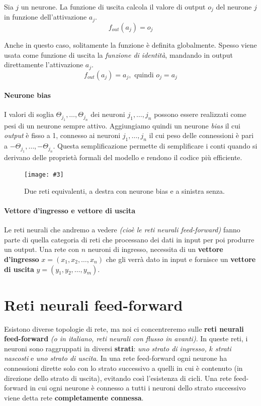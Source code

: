 \documentclass[12pt, twoside, letterpaper]{report}
\newcommand{\img}[4] {
	\begin{figure}
		\centering
		\texttt{[image: \#3]}\\
		\caption{#1}
		\label{#4}
	\end{figure}
}
\begin{document}
			 	Sia $j$ un neurone. La funzione di uscita calcola il valore di output $o_j$ del neurone $j$ in funzione dell'attivazione $a_j$. $$f_{out}(a_j) = o_j$$  
			 	
			 	Anche in questo caso, solitamente la funzione è definita globalmente. Spesso viene usata come funzione di uscita la \textit{funzione di identità}, mandando in output direttamente l'attivazione $a_j$. $$f_{out}(a_j) = a_j, \text{ quindi } o_j = a_j$$
			 	
			 \paragraph{Neurone bias} I valori di soglia $\Theta_{j_1}, \dots, \Theta_{j_n}$ dei neuroni $j_1, \dots, j_n$ possono essere realizzati come pesi di un neurone sempre attivo. Aggiungiamo quindi un neurone \textit{bias} il cui \textit{output} è fisso a 1, connesso ai neuroni $j_1, \dots, j_n$ il cui peso delle connessioni è pari a $-\Theta_{j_1}, \dots, -\Theta_{j_n}$. Questa semplificazione permette di semplificare i conti quando si derivano delle proprietà formali del modello e rendono il codice più efficiente.
			 
			 	\img{Due reti equivalenti, a destra con neurone bias e a sinistra senza.}{0.5}{bias-neuron.png}{bias}
			 	
			 \paragraph{Vettore d'ingresso e vettore di uscita} Le reti neurali che andremo a vedere \textit{(cioè le reti neurali feed-forward)} fanno parte di quella categoria di reti che processano dei dati in input per poi produrre un output. Una rete con $n$ neuroni di ingresso, necessita di un \textbf{vettore d'ingresso} $x = (x_1, x_2, \dots, x_n)$ che gli verrà dato in input e fornisce un \textbf{vettore di uscita} $y = (y_1, y_2, \dots, y_m)$.  
			 	 			 
		\section{Reti neurali feed-forward}
			Esistono diverse topologie di rete, ma noi ci concentreremo sulle \textbf{reti neurali feed-forward} \textit{(o in italiano, reti neurali con flusso in avanti)}. In queste reti, i neuroni sono raggruppati in diversi \textbf{strati}: \textit{uno strato di ingresso, $k$ strati nascosti} e \textit{uno strato di uscita}. In una rete feed-forward ogni neurone ha connessioni dirette solo con lo strato successivo a quelli in cui è contenuto (in direzione dello strato di uscita), evitando così l'esistenza di cicli. Una rete feed-forward in cui ogni neurone è connesso a tutti i neuroni dello strato successivo viene detta rete \textbf{completamente connessa}.
\end{document}
